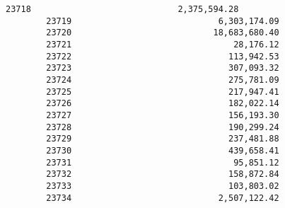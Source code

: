 \documentclass[11pt]{article}
\begin{document}
\begin{Verbatim}[commandchars=\\\{\}]
        23718                             2,375,594.28   
        23719                             6,303,174.09   
        23720                            18,683,680.40   
        23721                                28,176.12   
        23722                               113,942.53   
        23723                               307,093.32   
        23724                               275,781.09   
        23725                               217,947.41   
        23726                               182,022.14   
        23727                               156,193.30   
        23728                               190,299.24   
        23729                               237,481.88   
        23730                               439,658.41   
        23731                                95,851.12   
        23732                               158,872.84   
        23733                               103,803.02   
        23734                             2,507,122.42   
        

\end{Verbatim}
\end{document}
